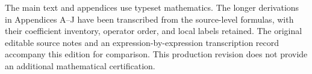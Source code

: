 \documentclass[11pt,letterpaper]{article}
\theoremstyle{definition}\newtheorem{hypothesis}[theorem]{Hypothesis}
\numberwithin{equation}{section}
\begin{document}
The main text and appendices use typeset mathematics. The longer derivations in Appendices A--J have been transcribed from the source-level formulas, with their coefficient inventory, operator order, and local labels retained. The original editable source notes and an expression-by-expression transcription record accompany this edition for comparison. This production revision does not provide an additional mathematical certification.












\end{document}
